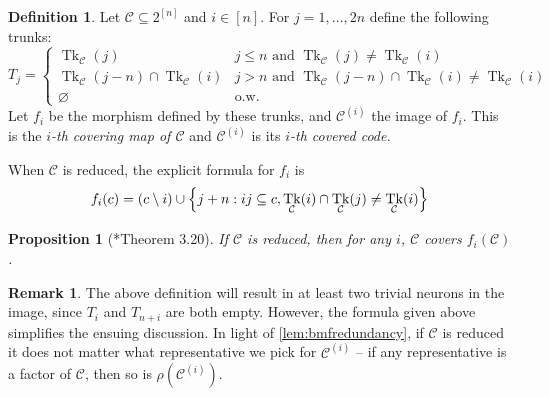 \documentclass[11pt,letterpaper, reqno]{amsart}
\newtheorem{prop}[thm]{Proposition}  %
\theoremstyle{definition}
\newtheorem{defn}[thm]{Definition}   %
\newtheorem{rmk}[thm]{Remark}
\DeclareMathOperator{\tk}{Tk}
\def\cC{\mathcal{C}}
\begin{document}
        \begin{defn}\label{def:excessivecovering}
            Let $\cC \subseteq 2^{[n]}$ and $i \in [n]$. For $j = 1,\dots, 2n$ define the following trunks:
            \[ T_j = \begin{cases} \tk_\cC(j) & j\leq n \text{ and } \tk_\cC(j) \neq \tk_\cC(i)\\
                \tk_\cC(j-n) \cap \tk_\cC(i) & j > n \text{ and } \tk_\cC(j-n) \cap \tk_\cC(i) \neq \tk_\cC(i)\\
                \varnothing & \text{o.w.}
            \end{cases} \]
            Let $f_i$ be the morphism defined by these trunks, and $\cC^{(i)}$ the image of $f_i$. This is the \emph{$i$-th covering map of $\cC$} and $\cC^{(i)}$ is its \emph{$i$-th covered code.}
            
            When $\cC$ is reduced, the explicit formula for $f_i$ is
                \begin{align}
                    f_i(c) = (c\setminus i) \cup \Bigl\{j+n : ij\subseteq c, \tk_\cC(i) \cap \tk_\cC(j) \neq \tk_\cC(i)\Bigr\} \label{eq:coveringformula}
                \end{align}
        \end{defn}
        \begin{prop}[\cite{jeffs2019sunflowers}*{Theorem 3.20}]
            If $\cC$ is reduced, then for any $i$, $\cC$ covers $f_i(\cC)$.
        \end{prop}

        \begin{rmk}
            The above definition will result in at least two trivial neurons in the image, since $T_i$ and $T_{n+i}$ are both empty.
            However, the formula given above simplifies the ensuing discussion.
            In light of \cref{lem:bmfredundancy}, if $\cC$ is reduced it does not matter what representative we pick for $\cC^{(i)}$ -- if any representative is a factor of $\cC$, then so is $\rho(\cC^{(i)})$.
        \end{rmk}
\end{document}
